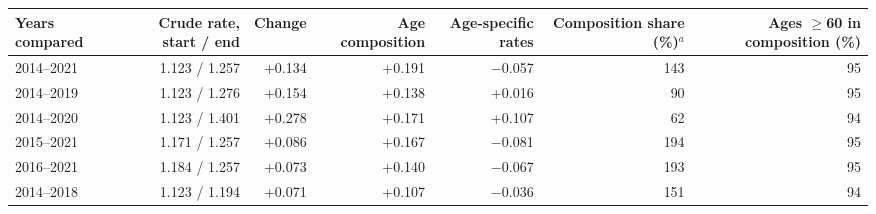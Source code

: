 \begin{tabular}{lrrrrrr}
\toprule
Years compared & Crude rate, start / end & Change & Age composition & Age-specific rates & Composition share (\%)$^{a}$ & Ages $\geq$60 in composition (\%) \\
\midrule
2014--2021 & 1.123 / 1.257 & +0.134 & +0.191 & $-$0.057 & 143 & 95 \\
2014--2019 & 1.123 / 1.276 & +0.154 & +0.138 & +0.016 & 90 & 95 \\
2014--2020 & 1.123 / 1.401 & +0.278 & +0.171 & +0.107 & 62 & 94 \\
2015--2021 & 1.171 / 1.257 & +0.086 & +0.167 & $-$0.081 & 194 & 95 \\
2016--2021 & 1.184 / 1.257 & +0.073 & +0.140 & $-$0.067 & 193 & 95 \\
2014--2018 & 1.123 / 1.194 & +0.071 & +0.107 & $-$0.036 & 151 & 94 \\
\bottomrule
\end{tabular}

